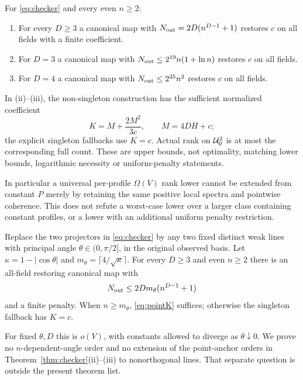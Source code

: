 \begin{theorem}\label{thm:checker}
For \eqref{eq:checker} and every even $n\geq2$:
\begin{enumerate}[label=(\roman*),leftmargin=*]
\item For every $D\geq3$ a canonical map with
$N_{\rm out}=2D(n^{D-1}+1)$ restores $c$ on all fields with a finite coefficient.
\item For $D=3$ a canonical map with
$N_{\rm out}\leq2^{19}n(1+\ln n)$ restores $c$ on all fields.
\item For $D=4$ a canonical map with
$N_{\rm out}\leq2^{25}n^2$ restores $c$ on all fields.
\end{enumerate}
In (ii)--(iii), the non-singleton construction has the sufficient normalized
coefficient
\begin{equation}\label{eq:pointK}
 K=M+\frac{2M^2}{3c},\qquad M=4DH+c;
\end{equation}
the explicit singleton fallbacks use $K=c$. Actual rank on $\mathcal U_0^2$ is at
most the corresponding full count. These are upper bounds, not optimality,
matching lower bounds, logarithmic necessity or uniform-penalty statements.
\end{theorem}
In particular a universal per-profile $\Omega(V)$ rank lower cannot be extended
from constant $P$ merely by retaining the same positive local spectra and
pointwise coherence. This does not refute a worst-case lower over a larger
class containing constant profiles, or a lower with an additional uniform
penalty restriction.

\begin{theorem}\label{thm:angle}
Replace the two projectors in \eqref{eq:checker} by any two fixed distinct weak
lines with principal angle $\theta\in(0,\pi/2]$, in the original observed basis.
Let $\kappa=1-|\cos\theta|$ and $m_\theta=\lceil4/\sqrt\kappa\rceil$.
For every $D\geq3$ and even $n\geq2$ there is an all-field restoring canonical
map with
\[
 N_{\rm out}\leq2Dm_\theta(n^{D-1}+1)
\]
and a finite penalty. When $n\geq m_\theta$, \eqref{eq:pointK} suffices;
otherwise the singleton fallback has $K=c$.
\end{theorem}
For fixed $\theta,D$ this is $o(V)$, with constants allowed to diverge as
$\theta\downarrow0$. We prove no $n$-dependent-angle order and no extension of
the point-anchor orders in Theorem~\ref{thm:checker}(ii)--(iii) to nonorthogonal
lines. That separate question is outside the present theorem list.

